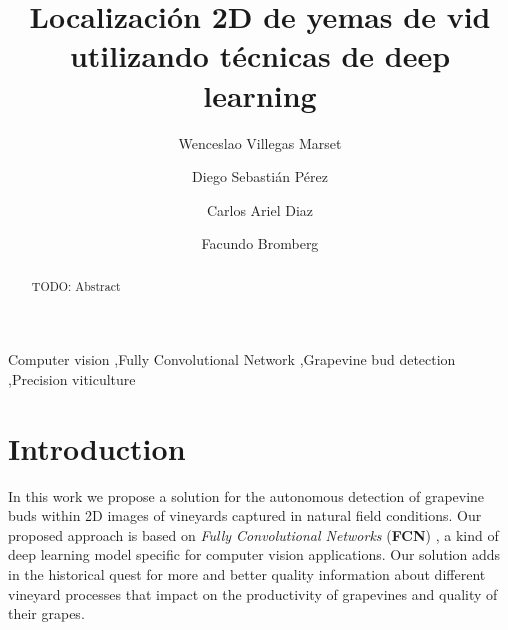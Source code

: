 \documentclass[a4paper,authoryear,review]{elsarticle}
\begin{document}
	
	\begin{frontmatter}
		
		\title{Localización 2D de yemas de vid utilizando técnicas de deep learning}
		
		\author[utn]{Wenceslao Villegas Marset}
		
		\author[utn,conicet]{Diego Sebastián Pérez}
		
		\author[utn]{Carlos Ariel Diaz}
		
		\author[utn,conicet]{Facundo Bromberg}
		
		\address[utn]{Universidad Tecnológica Nacional, Facultad Regional Mendoza, Grupo de Inteligencia Artificial DHARMa, Dpto. de Sistemas de la Información. Rodríguez 273, CP 5500, Mendoza, Argentina.}
		
		\address[conicet]{Consejo Nacional de Investigaciones Científicas y Técnicas (CONICET) .}
		
		
		\begin{abstract}
			TODO: Abstract
		\end{abstract}
		
		\begin{keyword}
			Computer vision \sep Fully Convolutional Network \sep Grapevine bud detection \sep Precision viticulture
		\end{keyword}
		
	\end{frontmatter}
	
	\linenumbers
	
	
	\section{Introduction} 
	
	In this work we propose a solution for the autonomous detection of grapevine buds within 2D images of vineyards captured in natural field conditions. Our proposed approach is based on \emph{Fully Convolutional Networks} (\textbf{FCN}) \citep{long2015fully, shelhamer2017fully}, a kind of deep learning model specific for computer vision applications. Our solution adds in the historical quest for more and better quality information about different vineyard processes that impact on the productivity of grapevines and quality of their grapes. 
	
\end{document}
